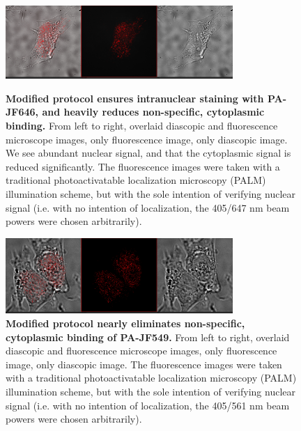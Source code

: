 \documentclass[%
 reprint,
 amsmath,amssymb,
 aps,
nobalancelastpage
]{revtex4-1}
\begin{document}
\begin{figure}[b] 
\includegraphics[width=3.4in]{Halo-tag PA646 - Fusion - 2x Mag - Area 1 - overlay.jpg}
\caption{\small \textbf{Modified protocol ensures intranuclear staining with PA-JF646, and heavily reduces non-specific, cytoplasmic binding.} From left to right, overlaid diascopic and fluorescence microscope images, only fluorescence image, only diascopic image. We see abundant nuclear signal, and that the cytoplasmic signal is reduced significantly. The fluorescence images were taken with a traditional photoactivatable localization microscopy (PALM) illumination scheme, but with the sole intention of verifying nuclear signal (i.e. with no intention of localization, the 405/647 nm beam powers were chosen arbitrarily).}
\label{fig1}
\hspace{1cm}
\includegraphics[width=3.4in]{Halo-tag PA549 - Fusion - 2x Mag - Area 4 - overlay.jpg}
\caption{\small \textbf{Modified protocol nearly eliminates non-specific, cytoplasmic binding of PA-JF549.} From left to right, overlaid diascopic and fluorescence microscope images, only fluorescence image, only diascopic image. The fluorescence images were taken with a traditional photoactivatable localization microscopy (PALM) illumination scheme, but with the sole intention of verifying nuclear signal (i.e. with no intention of localization, the 405/561 nm beam powers were chosen arbitrarily).}
\label{fig2}
\end{figure}
\end{document}
